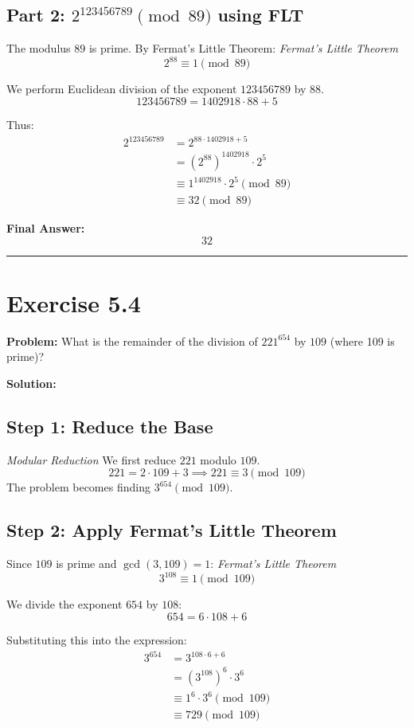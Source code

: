 \subsection*{Part 2: $2^{123456789} \pmod{89}$ using FLT}
The modulus $89$ is prime. By Fermat's Little Theorem:
\textit{Fermat's Little Theorem}
$$ 2^{88} \equiv 1 \pmod{89} $$

We perform Euclidean division of the exponent $123456789$ by $88$.
$$ 123456789 = 1402918 \cdot 88 + 5 $$

Thus:
\begin{align*}
    2^{123456789} &= 2^{88 \cdot 1402918 + 5} \\
    &= (2^{88})^{1402918} \cdot 2^5 \\
    &\equiv 1^{1402918} \cdot 2^5 \pmod{89} \\
    &\equiv 32 \pmod{89}
\end{align*}

\textbf{Final Answer:}
$$ 32 $$

\hrule
\vspace{1cm}
\newpage
\section*{Exercise 5.4}
\textbf{Problem:} What is the remainder of the division of $221^{654}$ by $109$ (where 109 is prime)?

\textbf{Solution:}

\subsection*{Step 1: Reduce the Base}
\textit{Modular Reduction}
We first reduce $221$ modulo $109$.
$$ 221 = 2 \cdot 109 + 3 \implies 221 \equiv 3 \pmod{109} $$
The problem becomes finding $3^{654} \pmod{109}$.

\subsection*{Step 2: Apply Fermat's Little Theorem}
Since $109$ is prime and $\gcd(3, 109)=1$:
\textit{Fermat's Little Theorem}
$$ 3^{108} \equiv 1 \pmod{109} $$

We divide the exponent $654$ by $108$:
$$ 654 = 6 \cdot 108 + 6 $$

Substituting this into the expression:
\begin{align*}
    3^{654} &= 3^{108 \cdot 6 + 6} \\
    &= (3^{108})^6 \cdot 3^6 \\
    &\equiv 1^6 \cdot 3^6 \pmod{109} \\
    &\equiv 729 \pmod{109}
\end{align*}

